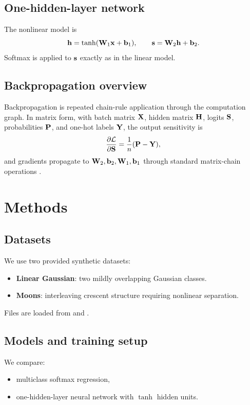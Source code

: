\documentclass[sigconf,screen,nonacm]{acmart}
\begin{document}
\subsection{One-hidden-layer network}
The nonlinear model is
\begin{equation}
    \mathbf{h}=\operatorname{tanh}(\mathbf{W}_1\mathbf{x}+\mathbf{b}_1), \qquad \mathbf{s}=\mathbf{W}_2\mathbf{h}+\mathbf{b}_2.
\end{equation}
Softmax is applied to $\mathbf{s}$ exactly as in the linear model.

\subsection{Backpropagation overview}
Backpropagation is repeated chain-rule application through the computation graph. In matrix form, with batch matrix $\mathbf{X}$, hidden matrix $\mathbf{H}$, logits $\mathbf{S}$, probabilities $\mathbf{P}$, and one-hot labels $\mathbf{Y}$, the output sensitivity is
\begin{equation}
    \frac{\partial\mathcal{L}}{\partial\mathbf{S}}=\frac{1}{n}(\mathbf{P}-\mathbf{Y}),
\end{equation}
and gradients propagate to $\mathbf{W}_2,\mathbf{b}_2,\mathbf{W}_1,\mathbf{b}_1$ through standard matrix-chain operations \cite{goodfellow2016deep,cs231n_backprop}.

\section{Methods}

\subsection{Datasets}
We use two provided synthetic datasets:
\begin{itemize}[leftmargin=*]
    \item \textbf{Linear Gaussian}: two mildly overlapping Gaussian classes.
    \item \textbf{Moons}: interleaving crescent structure requiring nonlinear separation.
\end{itemize}
Files are loaded from  and .

\subsection{Models and training setup}
We compare:
\begin{itemize}[leftmargin=*]
    \item multiclass softmax regression,
    \item one-hidden-layer neural network with $\tanh$ hidden units.
\end{itemize}
\end{document}
